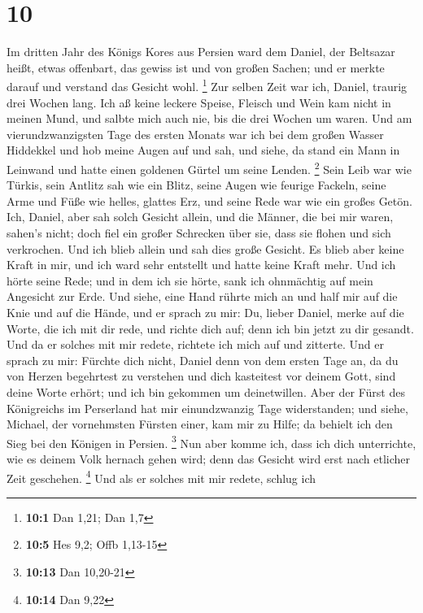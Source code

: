 \hypertarget{section-5}{%
\section{10}\label{section-5}}

 Im dritten Jahr des Königs Kores aus Persien ward dem
Daniel, der Beltsazar heißt, etwas offenbart, das gewiss ist und von
großen Sachen; und er merkte darauf und verstand das Gesicht wohl.
\footnote{\textbf{10:1} Dan 1,21; Dan 1,7}  Zur selben Zeit
war ich, Daniel, traurig drei Wochen lang.  Ich aß keine
leckere Speise, Fleisch und Wein kam nicht in meinen Mund, und salbte
mich auch nie, bis die drei Wochen um waren.  Und am
vierundzwanzigsten Tage des ersten Monats war ich bei dem großen Wasser
Hiddekkel  und hob meine Augen auf und sah, und siehe, da
stand ein Mann in Leinwand und hatte einen goldenen Gürtel um seine
Lenden. \footnote{\textbf{10:5} Hes 9,2; Offb 1,13-15}  Sein
Leib war wie Türkis, sein Antlitz sah wie ein Blitz, seine Augen wie
feurige Fackeln, seine Arme und Füße wie helles, glattes Erz, und seine
Rede war wie ein großes Getön.  Ich, Daniel, aber sah solch
Gesicht allein, und die Männer, die bei mir waren, sahen's nicht; doch
fiel ein großer Schrecken über sie, dass sie flohen und sich verkrochen.
 Und ich blieb allein und sah dies große Gesicht. Es blieb
aber keine Kraft in mir, und ich ward sehr entstellt und hatte keine
Kraft mehr.  Und ich hörte seine Rede; und in dem ich sie
hörte, sank ich ohnmächtig auf mein Angesicht zur Erde. 
Und siehe, eine Hand rührte mich an und half mir auf die Knie und auf
die Hände,  und er sprach zu mir: Du, lieber Daniel, merke
auf die Worte, die ich mit dir rede, und richte dich auf; denn ich bin
jetzt zu dir gesandt. Und da er solches mit mir redete, richtete ich
mich auf und zitterte.  Und er sprach zu mir: Fürchte dich
nicht, Daniel denn von dem ersten Tage an, da du von Herzen begehrtest
zu verstehen und dich kasteitest vor deinem Gott, sind deine Worte
erhört; und ich bin gekommen um deinetwillen.  Aber der
Fürst des Königreichs im Perserland hat mir einundzwanzig Tage
widerstanden; und siehe, Michael, der vornehmsten Fürsten einer, kam mir
zu Hilfe; da behielt ich den Sieg bei den Königen in Persien.
\footnote{\textbf{10:13} Dan 10,20-21}  Nun aber komme ich,
dass ich dich unterrichte, wie es deinem Volk hernach gehen wird; denn
das Gesicht wird erst nach etlicher Zeit geschehen. \footnote{\textbf{10:14}
  Dan 9,22}  Und als er solches mit mir redete, schlug ich
